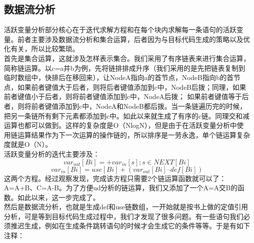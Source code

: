 \documentclass[12pt,a4paper,Flow]{report}
\begin{document}
\subsection{数据流分析}
活跃变量分析部分核心在于迭代求解方程和在每个块内求解每一条语句的活跃变量。前者主要涉及数据流分析和集合运算，后者因为与目标代码生成的策略以及优化有关，所以比较繁琐。\\
\indent 首先是集合运算，这就涉及怎样表示集合。我们采用了有序链表来进行集合运算，简称链运算。以c=a并b为例，先将链排排成升序（我们采用的是先把链表复制到临时数组中，快排后在移回来），让NodeA指向a的首节点，NodeB指向b的首节点，如果前者键值大于后者，则将后者键值添加到c中，NodeB后拨；同理，如果前者键值小于后者，则将前者键值添加到c中，NodeA后拨； 如果前者键值等于后者，则将前者键值添加到c中，NodeA和NodeB都后拨。当一条链遍历完的时候，把另一条链所有剩下元素都添加到c中。如此以来就生成了有序的c链。同理交和减运算也都可以做到。这样的复杂度是O（NlogN），但是由于在活跃变量分析中使用链运算结果作为下一次运算的操作链的，所以排序是一劳永逸，单个链运算复杂度就是O（N）。\\
\indent 活跃变量分析的迭代主要涉及：
\begin{displaymath}
	var_{out}[Bi] = +var_{in}[s];s\in NEXT[Bi]
\end{displaymath}
\begin{displaymath}
	var_{in}[Bi] = use[Bi] + (var_{out}[Bi] – def[Bi])
\end{displaymath}
这两个方程。经过观察发现，完成该方程只需要2个链运算函数就可以了：A=A+B、C=A-B。为了方便ud分析的链运算，我们又添加了一个A=A交B的函数。如此以来，这一步完成了。\\
\indent 然后是数据流分析，也就是生成def和use链数组，一开始就是按书上做的定值引用分析，可是等到目标代码生成过程中，我们才发现了很多问题。有一些语句我们必须推迟生成，例如在生成条件跳转语句的时候才会生成它的条件等等。于是有如下注释：
\end{document}
